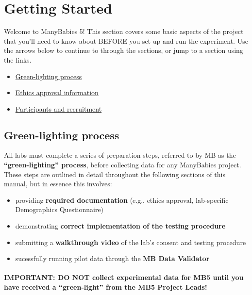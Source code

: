 \documentclass[
]{book}
\providecommand{\tightlist}{%
  \setlength{\itemsep}{0pt}\setlength{\parskip}{0pt}}
\begin{document}
\chapter{Getting Started}\label{getting-started}

Welcome to ManyBabies 5! This section covers some basic aspects of the project that you'll need to know about BEFORE you set up and run the experiment. Use the arrows below to continue to through the sections, or jump to a section using the links.

\begin{itemize}
\tightlist
\item
  \hyperref[green-lighting-process]{Green-lighting process}
\item
  \hyperref[ethics-approval]{Ethics approval information}
\item
  \hyperref[participants-and-recruitment]{Participants and recruitment}
\end{itemize}

\section{Green-lighting process}\label{green-lighting-process}

All labs must complete a series of preparation steps, referred to by MB as the \textbf{``green-lighting'' process}, before collecting data for any ManyBabies project. These steps are outlined in detail throughout the following sections of this manual, but in essence this involves:

\begin{itemize}
\tightlist
\item
  providing \textbf{required documentation} (e.g., ethics approval, lab-specific Demographics Questionnaire)
\item
  demonstrating \textbf{correct implementation of the testing procedure}
\item
  submitting a \textbf{walkthrough video} of the lab's consent and testing procedure
\item
  sucessfully running pilot data through the \textbf{MB Data Validator}
\end{itemize}

\subsubsection*{IMPORTANT: DO NOT collect experimental data for MB5 until you have received a ``green-light'' from the MB5 Project Leads!}\label{important-do-not-collect-experimental-data-for-mb5-until-you-have-received-a-green-light-from-the-mb5-project-leads}
\end{document}
